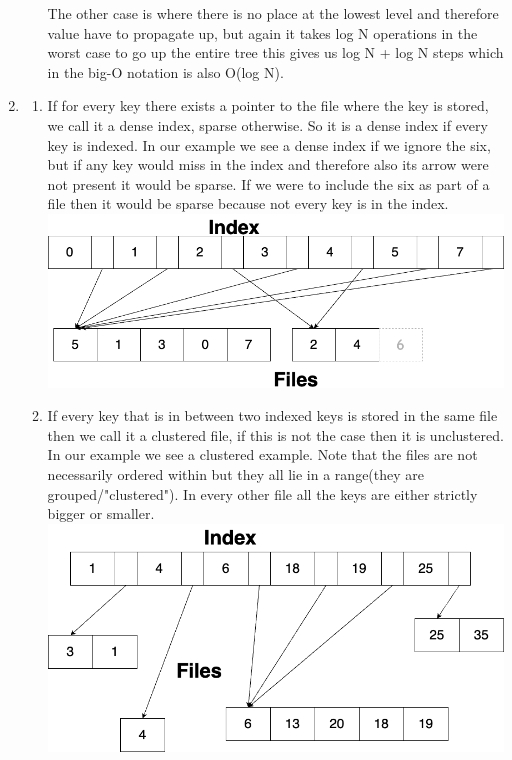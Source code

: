 \documentclass[12pt]{extarticle}
\begin{document}
\begin{flushleft}
\begin{enumerate}[label=\textbf{\Alph*.}]
\begin{enumerate}[label=\arabic*)]
The other case is where there is no place at the lowest level and therefore value have to propagate up, but again it takes log N operations in the worst case to go up the entire tree this gives us log N + log N steps which in the big-O notation is also O(log N).
\end{enumerate}
\item \begin{enumerate}[label=\arabic*)] 
\item If for every key there exists a pointer to the file where the key is stored, we call it a dense index, sparse otherwise. So it is a dense index if every key is indexed. 
In our example we see a dense index if we ignore the six, but if any key would miss in the index and therefore also its arrow were not present it would be sparse. If we were to include the six as part of a file then it would be sparse because not every key is in the index.
\includegraphics[width=\linewidth]{dense}
\item If every key that is in between two indexed keys is stored in the same file then we call it a clustered file, if this is not the case then it is unclustered. In our example we see a clustered example. Note that the files are not necessarily ordered within but they all lie in a range(they are grouped/"clustered"). In every other file all the keys are either strictly bigger or smaller. 
\includegraphics[width=\linewidth]{clustered}

\end{enumerate}
\end{enumerate}
\end{flushleft}
\end{document}
